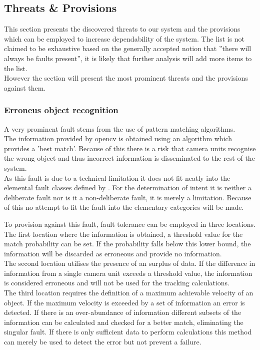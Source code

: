 \subsection{Threats \& Provisions}
This section presents the discovered threats to our system and the provisions which can be employed to increase dependability of the system.
The list is not claimed to be exhaustive based on the generally accepted notion that ''there will always be faults present'',
it is likely that further analysis will add more items to the list.\\
However the section will present the most prominent threats and the provisions against them.

\subsubsection{Erroneus object recognition}
A very prominent fault stems from the use of pattern matching algorithms.\\
The information provided by \gls{opencv} is obtained using an algorithm which provides a 'best match'.
Because of this there is a risk that camera units recognise the wrong object and thus incorrect information is disseminated to the rest of the system.\\
As this fault is due to a technical limitation it does not fit neatly into the elemental fault classes defined by \textcite{rts_depend}.
For the determination of intent it is neither a deliberate fault nor is it a non-deliberate fault, it is merely a limitation.
Because of this no attempt to fit the fault into the elementary categories will be made.

To provision against this fault, fault tolerance can be employed in three locations.\\
The first location where the information is obtained, a threshold value for the match probability can be set.
If the probability falls below this lower bound, the information will be discarded as erroneous and provide no information.\\
The second location utilises the presence of an surplus of data.
If the difference in information from a single camera unit exceeds a threshold value,
the information is considered erroneous and will not be used for the tracking calculations.\\
The third location requires the definition of a maximum achievable velocity of an object.
If the maximum velocity is exceeded by a set of information an error is detected.
If there is an over-abundance of information different subsets of the information can be calculated and checked for a better match, eliminating the singular fault.
If there is only sufficient data to perform calculations this method can merely be used to detect the error but not prevent a failure.

